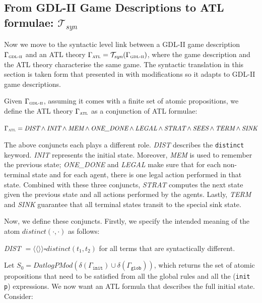 \documentclass{article}
\theoremstyle{theorem}
\theoremstyle{lemma}
\theoremstyle{definition}
\theoremstyle{remark}
\begin{document}
\subsection{From GDL-II Game Descriptions to ATL formulae: $\mathcal{T}_\textit{syn}$}
\par Now we move to the syntactic level link between a GDL-II game description $\Gamma_\textsc{gdl-ii}$ and an ATL theory $\Gamma_\textsc{atl} = \mathcal{T}_\textit{syn} (\Gamma_\textsc{gdl-ii})$, where the game description and the ATL theory characterise the same game. The syntactic translation in this section is taken form that presented in \citep{GDLpaper} with modifications so it adapts to GDL-II game descriptions.
\par Given $\Gamma_\textsc{gdl-ii}$, assuming it comes with a finite set of atomic propositions, we define the ATL theory $\Gamma_\textsc{atl}$ as a conjunction of ATL formulae:
\begin{center}
    $\Gamma_\textsc{atl}= \textit{DIST} \wedge \textit{INIT} \wedge \textit{MEM} \wedge \textit{ONE\_DONE} \wedge \textit{LEGAL} \wedge \textit{STRAT} \wedge \textit{SEES} \wedge \textit{TERM} \wedge \textit{SINK}$
\end{center}
 The above conjuncts each plays a different role. \textit{DIST} describes the \texttt{distinct} keyword. \textit{INIT} represents the initial state. Moreover, \textit{MEM} is used to remember the previous state; \textit{ONE\_DONE} and \textit{LEGAL} make sure that for each non-terminal state and for each agent, there is one legal action performed in that state. Combined with these three conjuncts, \textit{STRAT} computes the next state given the previous state and all actions performed by the agents. Lastly, \textit{TERM} and \textit{SINK} guarantee that all terminal states transit to the special sink state.
\par Now, we define these conjuncts. Firstly, we specify the intended meaning of the atom $distinct(\cdot,\cdot)$ as follows:
\begin{center}
    \textit{DIST} $= \langle \langle \rangle \rangle \square distinct(t_1, t_2)$ for all terms that are syntactically different.
\end{center}
\par Let $S_0 = \textit{DatlogPMod}(\delta(\Gamma_\texttt{init}) \cup \delta(\Gamma_\texttt{glob}))$, which returns the set of atomic propositions that need to be satisfied from all the global rules and all the (\texttt{init p}) expressions. We now want an ATL formula that describes the full initial state. Consider:
\end{document}
